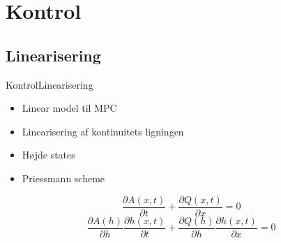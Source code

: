 \section{Kontrol}
\subsection{Linearisering}
\begin{frame}{Kontrol}{Linearisering}
 \vfill\vfill\centering    
\begin{itemize}
	\item Linear model til MPC\vspace{5mm}
	\item Linearisering af kontinuitets ligningen \vspace{5mm}
	\item Højde states \vspace{5mm}
	\item Priessmann scheme \vspace{5mm}
\end{itemize}
\begin{equation*}\label{eq:linearization_Continuity}
\frac{\partial A(x,t)}{\partial t} + \frac{\partial Q(x,t)}{\partial x}=0
\end{equation*}\vspace{5mm}
\begin{equation*}
	\frac{\partial A(h)}{\partial h}\frac{\partial h(x,t)}{\partial t} + \frac{\partial Q(h)}{\partial h}\frac{\partial h(x,t)}{\partial x}=0
\end{equation*}
\vfill\vfill
\end{frame}

